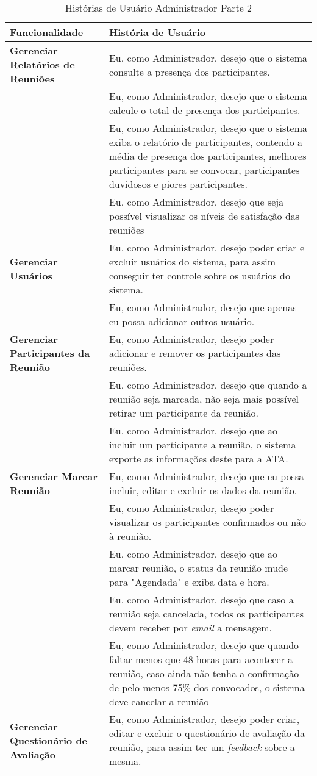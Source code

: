\begin{table}[H]
	\begin{tabular}{|p{5.0cm}|p{10.0cm}|} 
	\hline
	\textbf{Funcionalidade} & \textbf{História de Usuário} \\ \hline
	\textbf{Gerenciar Relatórios de Reuniões} & Eu, como Administrador, desejo que o sistema consulte a presença dos participantes. \\ \hline
	& Eu, como Administrador, desejo que o sistema calcule o total de presença dos participantes. \\ \hline
	& Eu, como Administrador, desejo que o sistema exiba o relatório de participantes, contendo a média de presença dos participantes, melhores participantes para se convocar, participantes duvidosos e piores participantes. \\ \hline
	& Eu, como Administrador, desejo que seja possível visualizar os níveis de satisfação das reuniões \\ \hline
	\textbf{Gerenciar Usuários} & Eu, como Administrador, desejo poder criar e excluir usuários do sistema, para assim conseguir ter controle sobre os usuários do sistema. \\ \hline
	& Eu, como Administrador, desejo que apenas eu possa adicionar outros usuário. \\ \hline
	\textbf{Gerenciar Participantes da Reunião} &  Eu, como Administrador, desejo poder adicionar e remover os participantes das reuniões. \\ \hline
	& Eu, como Administrador, desejo que quando a reunião seja marcada, não seja mais possível retirar um participante da reunião. \\ \hline
	& Eu, como Administrador, desejo que ao incluir um participante a reunião, o sistema exporte as informações deste para a ATA. \\ \hline
	\textbf{Gerenciar Marcar Reunião} & Eu, como Administrador, desejo que eu possa incluir, editar e excluir os dados da reunião. \\ \hline
	& Eu, como Administrador, desejo poder visualizar os participantes confirmados ou não à reunião. \\ \hline
	& Eu, como Administrador, desejo que ao marcar reunião, o status da reunião mude para "Agendada" e exiba data e hora. \\ \hline
	& Eu, como Administrador, desejo que caso a reunião seja cancelada, todos os participantes devem receber por \textit{email} a mensagem. \\ \hline
	& Eu, como Administrador, desejo que quando faltar menos que 48 horas para acontecer a reunião, caso ainda não tenha a confirmação de pelo menos 75\% dos convocados, o sistema deve cancelar a reunião \\ \hline
	\textbf{Gerenciar Questionário de Avaliação} & Eu, como Administrador, desejo poder criar, editar e excluir o questionário de avaliação da reunião, para assim ter um \textit{feedback} sobre a mesma. \\ \hline 
	\end{tabular}
	 \caption{Histórias de Usuário Administrador Parte 2}
	 \label{tab:historias_de_usuario_administrador_parte2}
\end{table}

